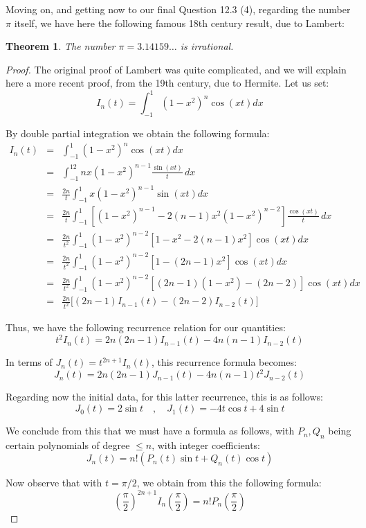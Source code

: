\documentclass[12pt]{amsbook}
\newtheorem{theorem}{Theorem}[chapter]
\begin{document}
\bigskip

Moving on, and getting now to our final Question 12.3 (4), regarding the number $\pi$ itself, we have here the following famous 18th century result, due to Lambert: 

\begin{theorem}
The number $\pi=3.14159\ldots$ is irrational.
\end{theorem}

\begin{proof}
The original proof of Lambert was quite complicated, and we will explain here a more recent proof, from the 19th century, due to Hermite. Let us set:
$$I_n(t)=\int_{-1}^1(1-x^2)^n\cos(xt)dx$$

By double partial integration we obtain the following formula:
\begin{eqnarray*}
I_n(t)
&=&\int_{-1}^1(1-x^2)^n\cos(xt)dx\\
&=&\int_{-1}^12nx(1-x^2)^{n-1}\frac{\sin(xt)}{t}\,dx\\
&=&\frac{2n}{t}\int_{-1}^1x(1-x^2)^{n-1}\sin(xt)dx\\
&=&\frac{2n}{t}\int_{-1}^1\left[(1-x^2)^{n-1}-2(n-1)x^2(1-x^2)^{n-2}\right]\frac{\cos(xt)}{t}\,dx\\
&=&\frac{2n}{t^2}\int_{-1}^1(1-x^2)^{n-2}\left[1-x^2-2(n-1)x^2\right]\cos(xt)dx\\
&=&\frac{2n}{t^2}\int_{-1}^1(1-x^2)^{n-2}\left[1-(2n-1)x^2\right]\cos(xt)dx\\
&=&\frac{2n}{t^2}\int_{-1}^1(1-x^2)^{n-2}\left[(2n-1)(1-x^2)-(2n-2)\right]\cos(xt)dx\\
&=&\frac{2n}{t^2}\big[(2n-1)I_{n-1}(t)-(2n-2)I_{n-2}(t)\big]
\end{eqnarray*}

Thus, we have the following recurrence relation for our quantities:
$$t^2I_n(t)=2n(2n-1)I_{n-1}(t)-4n(n-1)I_{n-2}(t)$$

In terms of $J_n(t)=t^{2n+1}I_n(t)$, this recurrence formula becomes:
$$J_n(t)=2n(2n-1)J_{n-1}(t)-4n(n-1)t^2J_{n-2}(t)$$

Regarding now the initial data, for this latter recurrence, this is as follows:
$$J_0(t)=2\sin t\quad,\quad J_1(t)=-4t\cos t+4\sin t$$

We conclude from this that we must have a formula as follows, with $P_n,Q_n$ being certain polynomials of degree $\leq n$, with integer coefficients:
$$J_n(t)=n!(P_n(t)\sin t+Q_n(t)\cos t)$$

Now observe that with $t=\pi/2$, we obtain from this the following formula:
$$\left(\frac{\pi}{2}\right)^{2n+1}I_n\left(\frac{\pi}{2}\right)=n!P_n\left(\frac{\pi}{2}\right)$$


\end{proof}
\end{document}
